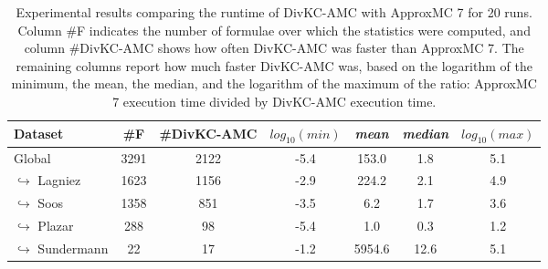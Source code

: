 \documentclass{article}
\newcommand\approxmc[0]{ApproxMC\xspace}
\newcommand\divkcamc[0]{DivKC-AMC\xspace}
\begin{document}
    
\begin{table}[h!]
        \centering
            \begin{tabular}{l|c|c|c|c|c|c}
                Dataset & \#F & \#\divkcamc & $\textit{log}_{10}(\textit{min})$ & \textit{mean} & \textit{median} & $\textit{log}_{10}(\textit{max})$ \\
                \hline 
Global & 3291 & 2122 &  -5.4 & 153.0 &   1.8 &   5.1 \\
$\hookrightarrow$ Lagniez \cite{D4} & 1623 & 1156 &  -2.9 & 224.2 &   2.1 &   4.9 \\
$\hookrightarrow$ Soos \cite{soos_2024_10449477} & 1358 & 851 &  -3.5 &   6.2 &   1.7 &   3.6 \\
$\hookrightarrow$ Plazar \cite{Plazar2019} & 288 & 98 &  -5.4 &   1.0 &   0.3 &   1.2 \\
$\hookrightarrow$ Sundermann \cite{SBK+:SPLC24} & 22 & 17 &  -1.2 & 5954.6 &  12.6 &   5.1 \\
            \end{tabular}
                \caption{Experimental results comparing the runtime of \divkcamc with \approxmc7 for 20 runs.
            Column \#F indicates the number of formulae over which the statistics were computed, and column \#\divkcamc shows how often \divkcamc was faster than \approxmc7.
            The remaining columns report how much faster \divkcamc was, based on the logarithm of the minimum, the mean, the median, and the logarithm of the maximum of the ratio: \approxmc7 execution time divided by \divkcamc execution time.
        }
        \label{divkc:tab:appmc:run}
    \end{table}
\end{document}

